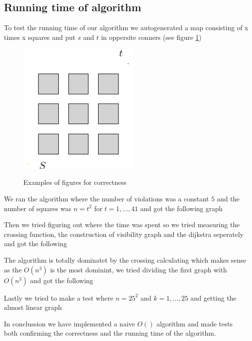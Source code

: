 \subsection{Running time of algorithm}
To test the running time of our algorithm we autogenerated a map consisting of
x times x squares and put $s$ and $t$ in oppersite conners (see figure
\ref{fig:test})
\begin{figure}[H]
	\caption{Examples of figures for correctness}
		\includegraphics[width=6cm]{figures/testexample.pdf}
		\label{fig:test}
\end{figure}

We ran the algorithm where the number of violations was a constant $5$ and the
number of squares was $n=t^2$ for $t=1,\dots,41$ and got the following graph


Then we tried figuring out where the time was spent so we tried measuring the
crossing function, the construction of visibility graph and the dijkstra
seperately and got the following


The algorithm is totally dominatet by the crossing calculating which makes
sense as the $O(n^3)$ is the most dominint, we tried dividing the first graph
with $O(n^3)$ and got the following


Lastly we tried to make a test where $n=25^2$ and $k=1,\dots,25$ and getting
the almost linear graph


In conclussion we have implemented a naive $O()$ algorithm and made tests both
confirming the correctness and the running time of the algorithm.
